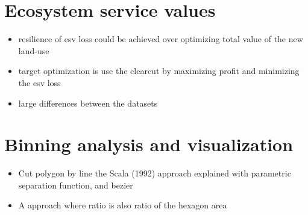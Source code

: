 	\section{Ecosystem service values}
		\begin{itemize}
			\item resilience of esv loss could be achieved over optimizing total value of the new land-use
			\item target optimization is use the clearcut by maximizing profit and minimizing the esv loss
			\item large differences between the datasets
		\end{itemize}

	\section{Binning analysis and visualization}
		\begin{itemize}
			\item Cut polygon by line the Scala (1992) approach explained with parametric separation function, and bezier
			\item A approach where ratio is also ratio of the hexagon area
		\end{itemize}

